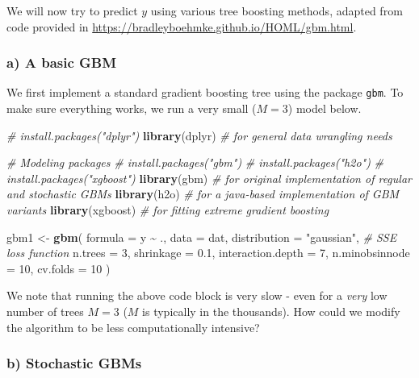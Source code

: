 \documentclass[
]{article}
\newenvironment{Shaded}{\begin{snugshade}}{\end{snugshade}}
\newcommand{\AttributeTok}[1]{\textcolor[rgb]{0.13,0.29,0.53}{#1}}
\newcommand{\CommentTok}[1]{\textcolor[rgb]{0.56,0.35,0.01}{\textit{#1}}}
\newcommand{\DecValTok}[1]{\textcolor[rgb]{0.00,0.00,0.81}{#1}}
\newcommand{\FloatTok}[1]{\textcolor[rgb]{0.00,0.00,0.81}{#1}}
\newcommand{\FunctionTok}[1]{\textcolor[rgb]{0.13,0.29,0.53}{\textbf{#1}}}
\newcommand{\NormalTok}[1]{#1}
\newcommand{\OtherTok}[1]{\textcolor[rgb]{0.56,0.35,0.01}{#1}}
\newcommand{\SpecialCharTok}[1]{\textcolor[rgb]{0.81,0.36,0.00}{\textbf{#1}}}
\newcommand{\StringTok}[1]{\textcolor[rgb]{0.31,0.60,0.02}{#1}}
\begin{document}
We will now try to predict \(y\) using various tree boosting methods,
adapted from code provided in
\url{https://bradleyboehmke.github.io/HOML/gbm.html}.

\hypertarget{a-a-basic-gbm}{%
\subsubsection{a) A basic GBM}\label{a-a-basic-gbm}}

We first implement a standard gradient boosting tree using the package
\texttt{gbm}. To make sure everything works, we run a very small
(\(M=3\)) model below.

\begin{Shaded}
\begin{Highlighting}[]
\CommentTok{\# install.packages("dplyr")}
\FunctionTok{library}\NormalTok{(dplyr)    }\CommentTok{\# for general data wrangling needs}

\CommentTok{\# Modeling packages}
\CommentTok{\# install.packages("gbm")}
\CommentTok{\# install.packages("h2o")}
\CommentTok{\# install.packages("xgboost")}
\FunctionTok{library}\NormalTok{(gbm)      }\CommentTok{\# for original implementation of regular and stochastic GBMs}
\FunctionTok{library}\NormalTok{(h2o)      }\CommentTok{\# for a java{-}based implementation of GBM variants}
\FunctionTok{library}\NormalTok{(xgboost)  }\CommentTok{\# for fitting extreme gradient boosting}

\NormalTok{gbm1 }\OtherTok{\textless{}{-}} \FunctionTok{gbm}\NormalTok{(}
  \AttributeTok{formula =}\NormalTok{ y }\SpecialCharTok{\textasciitilde{}}\NormalTok{ .,}
  \AttributeTok{data =}\NormalTok{ dat,}
  \AttributeTok{distribution =} \StringTok{"gaussian"}\NormalTok{,  }\CommentTok{\# SSE loss function}
  \AttributeTok{n.trees =} \DecValTok{3}\NormalTok{,}
  \AttributeTok{shrinkage =} \FloatTok{0.1}\NormalTok{,}
  \AttributeTok{interaction.depth =} \DecValTok{7}\NormalTok{,}
  \AttributeTok{n.minobsinnode =} \DecValTok{10}\NormalTok{,}
  \AttributeTok{cv.folds =} \DecValTok{10}
\NormalTok{)}
\end{Highlighting}
\end{Shaded}

We note that running the above code block is very slow - even for a
\emph{very} low number of trees \(M=3\) (\(M\) is typically in the
thousands). How could we modify the algorithm to be less computationally
intensive?

\hypertarget{b-stochastic-gbms}{%
\subsubsection{b) Stochastic GBMs}\label{b-stochastic-gbms}}
\end{document}

